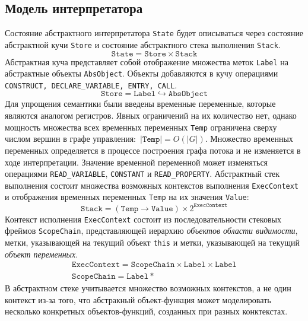 \subsection{Модель интерпретатора}%
\label{sec:interpretmodel}
Состояние абстрактного интерпретатора \texttt{State} будет описываться
через состояние абстрактной кучи \texttt{Store} и состояние
абстрактного стека выполнения \texttt{Stack}.
\[
\mathtt{
State = Store \times Stack
}
\]%
Абстрактная куча представляет собой отображение множества меток
\texttt{Label} на абстрактные объекты \texttt{AbsObject}.
Объекты добавляются в кучу операциями \texttt{CONSTRUCT,
DECLARE\_VARIABLE, ENTRY, CALL}.
\[
\mathtt{
Store = Label \hookrightarrow {AbsObject}
}
\]%
Для упрощения семантики были введены временные переменные, которые
являются аналогом регистров. Явных ограничений на их количество нет,
однако мощность множества всех временных переменных \texttt{Temp}
ограничена сверху числом вершин в графе управления:~$|\mathtt{Temp}| =
O\left(|G|\right)$. Множество временных переменных определяется в
процессе построения графа потока и не изменяется в ходе
интерпретации. Значение временной переменной может изменяться
операциями \texttt{READ\_VARIABLE}, \texttt{CONSTANT} и
\texttt{READ\_PROPERTY}. Абстрактный стек выполнения состоит множества
возможных контекстов выполнения \texttt{ExecContext} и отображения
временных переменных \texttt{Temp} на их значения \texttt{Value}:
\[
  \mathtt{Stack} = (\mathtt{Temp} \rightarrow \mathtt{Value}) \times
  2^{\mathtt{ExecContext}}
\]%
Контекст исполнения \texttt{ExecContext} состоит из последовательности
стековых фреймов \texttt{ScopeChain}, представляющей иерархию
\emph{объектов области видимости}, метки, указывающей на текущий
объект \texttt{this} и метки, указывающей на текущий \emph{объект
переменных}.
\begin{gather*}
  \mathtt{ ExecContext = ScopeChain \times Label \times Label }\\
  \mathtt{ ScopeChain = Label* }
\end{gather*}
В абстрактном стеке учитывается множество возможных контекстов, а не
один контекст из-за того, что абстракный объект-функция может
моделировать несколько конкретных объектов-функций, созданных при
разных конктекстах.

